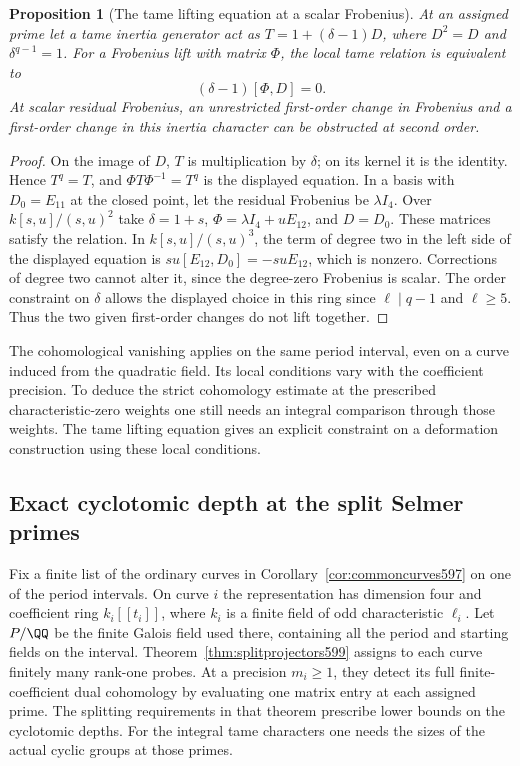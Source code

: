 \documentclass[a4paper,11pt]{article}
\newtheorem{proposition}{Proposition}[section]
\theoremstyle{definition}
\theoremstyle{remark}
\numberwithin{equation}{section}
\begin{document}
\begin{proposition}[The tame lifting equation at a scalar Frobenius]
\leavevmode\label{prop:rankonelift599}
At an assigned prime let a tame inertia generator act
as \(T=1+(\delta-1)D\), where \(D^2=D\) and
\(\delta^{q-1}=1\). For a Frobenius lift with matrix
\(\Phi\), the local tame relation is equivalent to
\[
                    (\delta-1)[\Phi,D]=0.
\]
At scalar residual Frobenius, an unrestricted first-order
change in Frobenius and a first-order change in this
inertia character can be obstructed at second order.
\end{proposition}
\begin{proof}
On the image of \(D\), \(T\) is multiplication by
\(\delta\); on its kernel it is the identity. Hence
\(T^q=T\), and \(\Phi T\Phi^{-1}=T^q\) is the displayed
equation. In a basis with \(D_0=E_{11}\) at the closed
point, let the residual Frobenius be \(\lambda I_4\).
Over \(k[s,u]/(s,u)^2\) take \(\delta=1+s\),
\(\Phi=\lambda I_4+uE_{12}\), and \(D=D_0\). These
matrices satisfy the relation. In \(k[s,u]/(s,u)^3\),
the term of degree two in the left side of the displayed
equation is \(su[E_{12},D_0]=-suE_{12}\), which is
nonzero. Corrections of degree two cannot alter it,
since the degree-zero Frobenius is scalar. The order
constraint on \(\delta\) allows the displayed choice
in this ring since \(\ell\mid q-1\) and \(\ell\ge5\).
Thus the two given first-order changes do not lift together.
\end{proof}

The cohomological vanishing applies on the same period
interval, even on a curve induced from the quadratic
field. Its local conditions vary with the coefficient
precision. To deduce the strict cohomology estimate at
the prescribed characteristic-zero weights one still
needs an integral comparison through those weights.
The tame lifting equation gives an explicit constraint
on a deformation construction using these local conditions.



\subsection{Exact cyclotomic depth at the split Selmer primes}
\label{sec:exactselmer614}

Fix a finite list of the ordinary curves in
Corollary~\ref{cor:commoncurves597} on one of the period intervals.
On curve \(i\) the representation has dimension four and coefficient
ring \(k_i[[t_i]]\), where \(k_i\) is a finite field of odd
characteristic \(\ell_i\). Let \(P/\QQ\) be the finite Galois field
used there, containing all the period and starting fields on the
interval. Theorem~\ref{thm:splitprojectors599} assigns to each
curve finitely many rank-one probes. At a precision \(m_i\ge1\),
they detect its full finite-coefficient dual cohomology by evaluating
one matrix entry at each assigned prime. The splitting requirements
in that theorem prescribe lower bounds on the cyclotomic depths.
For the integral tame characters one needs the sizes of the actual
cyclic groups at those primes.
\end{document}

